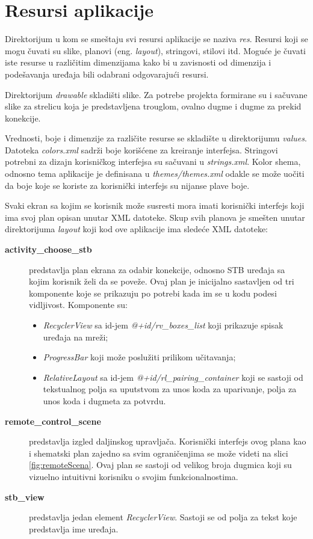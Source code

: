 \documentclass[implementacija.tex]{subfiles}
\begin{document}



\section{Resursi aplikacije}
Direktorijum u kom se smeštaju svi resursi aplikacije se naziva \textit{res}. Resursi koji se mogu čuvati su slike, planovi (eng. \textit{layout}), stringovi, stilovi itd. Moguće je čuvati iste resurse u različitim dimenzijama kako bi u zavisnosti od dimenzija i podešavanja uređaja bili odabrani odgovarajući resursi.

Direktorijum \textit{drawable} skladišti slike. Za potrebe projekta formirane su i sačuvane slike za strelicu koja je predstavljena trouglom, ovalno dugme i dugme za prekid konekcije. 

Vrednosti, boje i dimenzije za različite resurse se skladište u direktorijumu \textit{values}. Datoteka \textit{colors.xml} sadrži boje korišćene za kreiranje interfejsa. Stringovi potrebni za dizajn korisničkog interfejsa su sačuvani u \textit{strings.xml}. Kolor shema, odnosno tema aplikacije je definisana u \textit{themes/themes.xml} odakle se može uočiti da boje koje se koriste za korisnički interfejs su nijanse plave boje. 

Svaki ekran sa kojim se korisnik može susresti mora imati korisnički interfejs koji ima svoj plan opisan unutar XML datoteke. Skup svih planova je smešten unutar direktorijuma \textit{layout} koji kod ove aplikacije ima sledeće XML datoteke:
\begin{description}
\item[\textbf{activity\_choose\_stb}] predstavlja plan ekrana za odabir konekcije, odnosno STB uređaja sa kojim korisnik želi da se poveže. Ovaj plan je inicijalno sastavljen od tri komponente koje se prikazuju po potrebi kada im se u kodu podesi vidljivost. Komponente su:
\begin{itemize}
    \item \textit{RecyclerView} sa id-jem \textit{@+id/rv\_boxes\_list} koji prikazuje spisak uređaja na mreži;
    \item \textit{ProgressBar} koji može poslužiti prilikom učitavanja;
    \item \textit{RelativeLayout} sa id-jem \textit{@+id/rl\_pairing\_container} koji se sastoji od tekstualnog polja sa uputstvom za unos koda za uparivanje, polja za unos koda i dugmeta za potvrdu.
\end{itemize}
\item[\textbf{remote\_control\_scene}] predstavlja izgled daljinskog upravljača. Korisnički interfejs ovog plana kao i shematski plan zajedno sa svim ograničenjima se može videti na slici \ref{fig:remoteScena}. Ovaj plan se sastoji od velikog broja dugmica koji su vizuelno intuitivni korisniku o svojim funkcionalnostima.
\item[\textbf{stb\_view}] predstavlja jedan element \textit{RecyclerView}. Sastoji se od polja za tekst koje predstavlja ime uređaja. 
\end{description}
\end{document}
